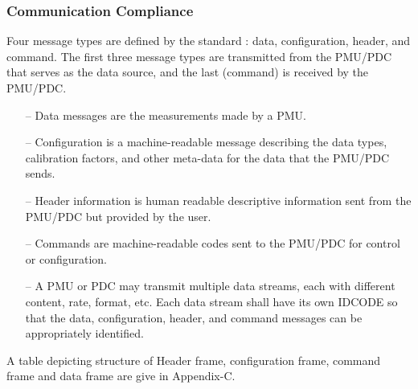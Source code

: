 \subsubsection{Communication Compliance}
Four  message  types  are  defined  by the standard \cite{c37.118.2}:  data, configuration, header,  and  command.  The  first  three  message  types are transmitted from the PMU/PDC that serves as the data source, and the last (command) is received by the PMU/PDC.
\begin{itemize}
	\item[--] Data messages are the measurements made by a PMU.
	\item[--] Configuration  is  a  machine-readable  message  describing  the  data  types,  calibration  factors,  and  other meta-data for the data that the PMU/PDC sends.
	\item[--] Header  information  is  human  readable  descriptive  information  sent  from  the  PMU/PDC  but provided by the user.  
	\item[--] Commands are machine-readable codes sent to the PMU/PDC for control or configuration.  
	\item[--] A PMU or PDC may transmit multiple data streams,	each with different content, rate, format, etc. Each data stream shall have its own IDCODE so that the data, configuration, header, and command messages  can  be  appropriately  identified. 
\end{itemize}

A table depicting structure of Header frame, configuration frame, command frame and data frame are give in Appendix-C.
